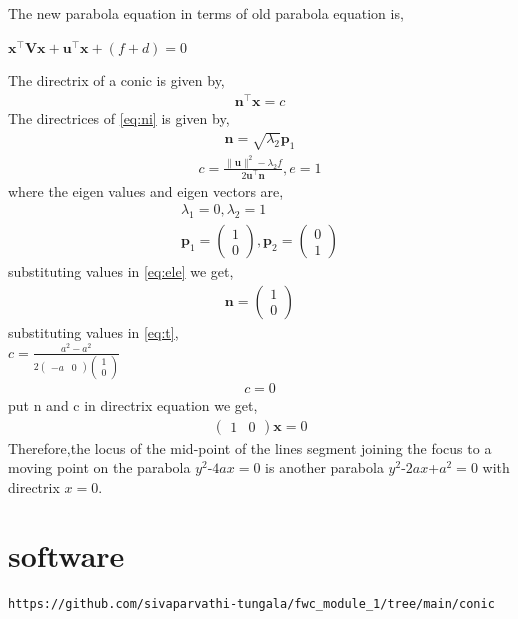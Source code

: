 \documentclass[journal,12pt,twocolumn]{IEEEtran}
\newcommand{\myvec}[1]{\ensuremath{\begin{pmatrix}#1\end{pmatrix}}}
\let\vec\mathbf
\begin{document}
The new parabola equation in terms of old parabola equation is,\\
\begin{center}
$\vec{x}^\top\vec{V}\vec{x}+\vec{u}^\top\vec{x}+(f+d)=0$
\end{center}
The directrix of a conic is given by,
\begin{align}
\label{eq:te}
\vec{n}^\top\vec{x}=c
\end{align}
The directrices of \eqref{eq:ni} is given by,\\
\begin{align}
\label{eq:ele}
\vec{n}=\sqrt{\lambda_2}\vec{p}_{1}
\end{align}
\begin{align}
\label{eq:t}
c=\frac{\|\vec{u}\|^2-\lambda_2 f}{2\vec{u}^\top\vec{n}} , e=1
\end{align}
where the eigen values and eigen vectors are,\\
\begin{align}
\label{eq:twe}
\lambda_1=0 , \lambda_2=1\\
\vec{p}_{1}=\myvec{1\\0}, \vec{p}_{2}=\myvec{0\\1} 
\end{align}
substituting values in \eqref{eq:ele} we get,\\
\begin{align}
\label{eq:thir}
\vec{n}=\myvec{1\\0}
\end{align}
substituting values in \eqref{eq:t},\\
$c=\frac{a^2-a^2}{2\myvec{-a & 0}\myvec{1\\0}}$\\
\begin{align}
\label{eq:fourteen}
c=0
\end{align}
put n and c in directrix equation we get,
\begin{align}
\label{eq:fif}
\myvec{1&0}\vec{x}=0
\end{align}
        Therefore,the locus of the mid-point of the lines segment joining the focus to a moving point on the parabola $y^2$-$4ax=0$ is another parabola $y^2$-$2ax$+$a^2=0$ with directrix $x=0$.\\



\section{\textbf{software}}
\begin{lstlisting}
https://github.com/sivaparvathi-tungala/fwc_module_1/tree/main/conic
\end{lstlisting}
\end{document}
